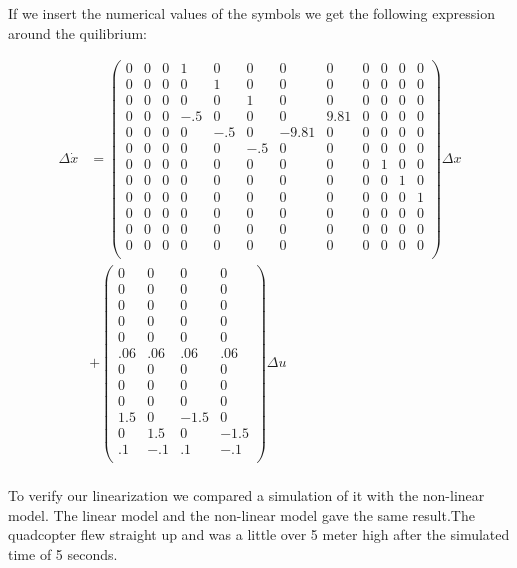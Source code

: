 \documentclass[]{article}
\begin{document}
\newpage
If we insert the numerical values of the symbols we get the following expression around the quilibrium:

\begin{align*}
\Delta \dot{x} &= 
\begin{pmatrix}
0 & 0 & 0 &1 &0 &0 &0 &0 &0 &0 &0 &0 \\
0 & 0 & 0 &0 &1 &0 &0 &0 &0 &0 &0 &0 \\
0 & 0 & 0 &0 &0 &1 &0 &0 &0 &0 &0 &0 \\
0 & 0 & 0 & -.5 &0 &0 &0 & 9.81 &0 &0 &0 &0 \\
0 & 0 & 0 &0 & -.5 &0 & -9.81&0 &0 &0 &0 &0 \\
0 & 0 & 0 &0 &0 &-.5 &0 &0 &0 &0 &0 &0 \\
0 & 0 & 0 &0 &0 &0 &0 &0 &0 &1 &0 &0 \\
0 & 0 & 0 &0 &0 &0 &0 &0 &0 &0 &1 &0 \\
0 & 0 & 0 &0 &0 &0 &0 &0 &0 &0 &0 &1 \\
0 & 0 & 0 &0 &0 &0 &0 &0 &0 &0 &0 &0 \\
0 & 0 & 0 &0 &0 &0 &0 &0 &0 &0 &0 &0 \\
0 & 0 & 0 &0 &0 &0 &0 &0 &0 &0 &0 &0 \\
\end{pmatrix}\Delta x \\
& + \begin{pmatrix}
0 & 0 & 0 &0\\
0 & 0 & 0 &0\\
0 & 0 & 0 &0\\
0 & 0 & 0 &0\\
0 & 0 & 0 &0\\
.06 & .06 & .06&.06\\
0 & 0 & 0 &0\\
0 & 0 & 0 &0\\
0 & 0 & 0 &0\\
1.5 & 0 & -1.5 & 0 \\
0 & 1.5 & 0 & - 1.5 \\
.1 & - .1 & .1 & -.1 \\
\end{pmatrix} \Delta u \\
\end{align*}

To verify our linearization we compared a simulation of it with the non-linear model. The linear model and the non-linear model gave the same result.The quadcopter flew straight up and was a little over 5 meter high after the simulated time of 5 seconds.
\end{document}
